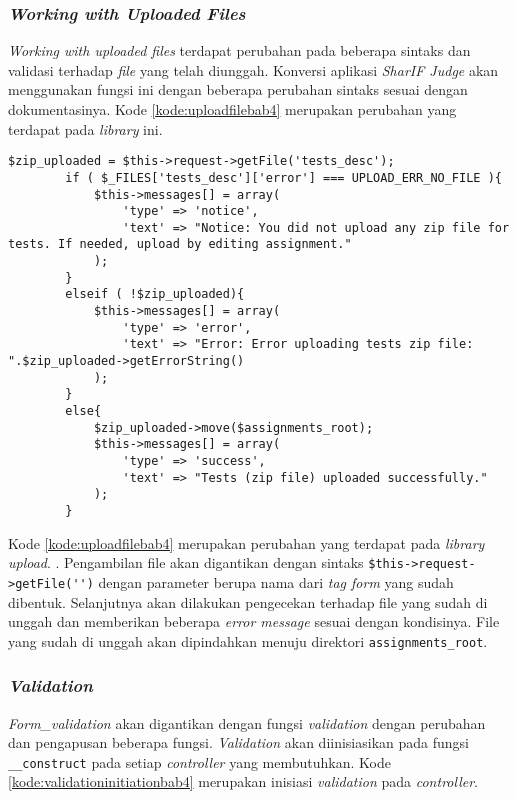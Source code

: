 \subsubsection{\textit{Working with Uploaded Files}}
\textit{Working with uploaded files} terdapat perubahan pada beberapa sintaks dan validasi terhadap \textit{file} yang telah diunggah. Konversi aplikasi \textit{SharIF Judge} akan menggunakan fungsi ini dengan beberapa perubahan sintaks sesuai dengan dokumentasinya. Kode \ref{kode:uploadfilebab4} merupakan perubahan yang terdapat pada \textit{library} ini. 
\begin{lstlisting}[caption=Perancangan perubahan \textit{library upload} pada \textit{CodeIgniter 4}, label=kode:uploadfilebab4]
$zip_uploaded = $this->request->getFile('tests_desc');
		if ( $_FILES['tests_desc']['error'] === UPLOAD_ERR_NO_FILE ){
			$this->messages[] = array(
				'type' => 'notice',
				'text' => "Notice: You did not upload any zip file for tests. If needed, upload by editing assignment."
			);
		}
		elseif ( !$zip_uploaded){
			$this->messages[] = array(
				'type' => 'error',
				'text' => "Error: Error uploading tests zip file: ".$zip_uploaded->getErrorString()
			);
		}
		else{
			$zip_uploaded->move($assignments_root);
			$this->messages[] = array(
				'type' => 'success',
				'text' => "Tests (zip file) uploaded successfully."
			);
		}
\end{lstlisting}

Kode \ref{kode:uploadfilebab4} merupakan perubahan yang terdapat pada \textit{library upload}. . Pengambilan file akan digantikan dengan sintaks \verb|$this->request->getFile('')| dengan parameter berupa nama dari \textit{tag form} yang sudah dibentuk. Selanjutnya akan dilakukan pengecekan terhadap file yang sudah di unggah dan memberikan beberapa \textit{error message} sesuai dengan kondisinya. File yang sudah di unggah akan dipindahkan menuju direktori \texttt{assignments\_root}.

\subsubsection{\textit{Validation}}
\textit{Form\_validation} akan digantikan dengan fungsi \textit{validation} dengan perubahan dan pengapusan beberapa fungsi. \textit{Validation} akan diinisiasikan pada fungsi \texttt{\_\_construct} pada setiap \textit{controller} yang membutuhkan. Kode \ref{kode:validationinitiationbab4} merupakan inisiasi \textit{validation} pada \textit{controller}.

